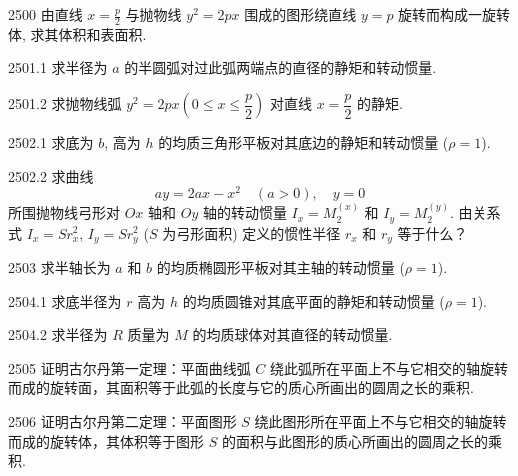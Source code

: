 \begin{prob}[M]{2500}
由直线 $x = \frac{p}{2}$ 与抛物线 $y^2 = 2px$ 围成的图形绕直线 $y = p$ 旋转而构成一旋转体, 求其体积和表面积.
\end{prob}


\begin{prob}[M]{2501.1}
求半径为 $a$ 的半圆弧对过此弧两端点的直径的静矩和转动惯量.
\end{prob}

\begin{prob}[M]{2501.2}
求抛物线弧 $y^2 = 2px \left(0 \leqslant x \leqslant \dfrac{p}{2}\right)$ 对直线 $x = \dfrac{p}{2}$ 的静矩.
\end{prob}

\begin{prob}[M]{2502.1}
求底为 $b$, 高为 $h$ 的均质三角形平板对其底边的静矩和转动惯量 ($\rho = 1$).
\end{prob}

\begin{prob}[M]{2502.2}
求曲线
\[
ay = 2ax - x^2 \quad (a > 0), \quad y = 0
\]
所围抛物线弓形对 $Ox$ 轴和 $Oy$ 轴的转动惯量 $I_x = M_2^{(x)}$ 和 $I_y = M_2^{(y)}$. 由关系式 $I_x = S r_x^2$, $I_y = S r_y^2$ ($S$ 为弓形面积) 定义的惯性半径 $r_x$ 和 $r_y$ 等于什么？
\end{prob}

\begin{prob}[M]{2503}
求半轴长为 $a$ 和 $b$ 的均质椭圆形平板对其主轴的转动惯量 ($\rho = 1$).
\end{prob}

\begin{prob}[M]{2504.1}
求底半径为 $r$ 高为 $h$ 的均质圆锥对其底平面的静矩和转动惯量 ($\rho = 1$).
\end{prob}

\begin{prob}[M]{2504.2}
求半径为 $R$ 质量为 $M$ 的均质球体对其直径的转动惯量.
\end{prob}

\begin{prob}[M]{2505}
证明古尔丹第一定理：平面曲线弧 $C$ 绕此弧所在平面上不与它相交的轴旋转而成的旋转面，其面积等于此弧的长度与它的质心所画出的圆周之长的乘积.
\end{prob}

\begin{prob}[M]{2506}
证明古尔丹第二定理：平面图形 $S$ 绕此图形所在平面上不与它相交的轴旋转而成的旋转体，其体积等于图形 $S$ 的面积与此图形的质心所画出的圆周之长的乘积.
\end{prob}

